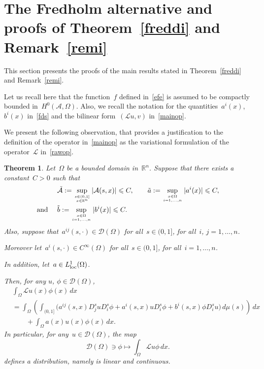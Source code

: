 \documentclass[11pt,hyp,]{nyjm}
\numberwithin{equation}{section}
\newcommand{\R}{\mathbb{R}}
\newtheorem{theorem}{Theorem}[section]
\theoremstyle{remark}
\renewcommand{\leq}{\leqslant}
\begin{document}
\section{The Fredholm alternative and proofs of Theorem~\ref{freddi} and Remark~\ref{remi}}\label{mainres}

This section presents the proofs of the main results stated in Theorem~\ref{freddi} and Remark~\ref{remi}.

Let us recall here that the function~$f$ defined in~\eqref{efe} is assumed to be compactly bounded in~$H^0(\mathcal{A}, \Omega)$. Also, we recall the notation for the quantities~$a^i(x)$,~$b^i(x)$ in~\eqref{fds} and the bilinear form~$(\mathcal{L}u,v)$ in~\eqref{mainop}.


We present the following observation, that provides a justification to the definition of the operator in~\eqref{mainop} as the variational formulation of the operator~$\mathcal{L}$ in~\eqref{rawop}.

\begin{theorem}\label{hdhdhd}
 Let~$\Omega$ be a bounded domain in~$\R^n$. 
Suppose that there exists a constant~$C>0$ such that
\begin{equation}\label{bimbm}
\begin{split}&
 \tilde{\mathcal{A}} :=
\displaystyle \sup_{{s\in (0,1]}\atop{ x \in \R^n}} | \mathcal{A}(s,x)| \leq C ,\qquad
 \tilde{a}:= \displaystyle\sup_{{x \in \Omega}\atop{i=1,\ldots,n} } |a^i(x) | \leq C ,\\
{\mbox{and }}\quad &\tilde{b}:= \sup_{{x \in \Omega}\atop{i=1,\ldots,n} } |b^i(x) | \leq C .
\end{split}
\end{equation}
Also, suppose that~$a^{ij}(s,\cdot)\in\mathcal{D}(\Omega)$ for all~$s\in(0,1]$, for all~$i$, $j=1,\dots,n$.

Moreover let~$a^i(s,\cdot) \in C^{\infty}(\Omega)$ for all~$s\in(0,1]$, for all~$i=1,\dots,n$. 

In addition, let~$a \in L^{1}_{\rm loc}(\Omega)$. 
 
Then, for any $u $, $\phi\in \mathcal{D}(\Omega)$,
\begin{equation}\label{hucdmdt}
\begin{split}&
\int_{\Omega}  \mathcal{L}u(x) \phi(x) \, dx \\&= \int_{\Omega} \left( \int_{(0,1]} \Big(a^{ij}(s,x) D^s_ju D^s_i \phi + a^i(s,x) u D^s_i \phi + b^i(s,x)\phi D^s_i u \Big)\, d\mu (s) \right)\, dx \\
&\quad\quad+ \int_{\Omega} a(x) u(x) \phi(x) \, dx.
\end{split} 
\end{equation}
In particular, for any~$u \in \mathcal{D}(\Omega)$, the map
\begin{equation}\label{sssss}
\mathcal{D}(\Omega) \ni  \phi \mapsto \int_{\Omega}  \mathcal{L}u \phi  \, dx.
\end{equation}
defines a distribution, namely is linear and continuous.
\end{theorem}
\end{document}
